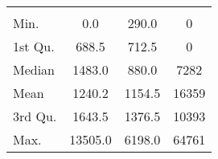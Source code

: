 \begin{tabular}{lS[table-format=5.1]S[table-format=5.1]S[table-format=5.1]}
&  &  &  \\
 Min.    & 0.0 & 290.0 & 0 \\
 1st Qu. & 688.5 & 712.5 & 0 \\
 Median  & 1483.0 & 880.0 & 7282 \\
 Mean    & 1240.2 & 1154.5 & 16359 \\
 3rd Qu. & 1643.5 & 1376.5 & 10393 \\
 Max.    & 13505.0 & 6198.0 & 64761 \\
\end{tabular}
